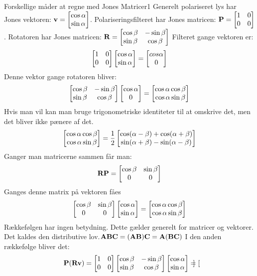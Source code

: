 \begin{opgave}{Forskellige måder at regne med Jones Matricer}{1}
Generelt polariseret lys har Jones vektoren: $\v v = \xy{\cos \alpha}{\sin \alpha}$. Polariseringsfilteret har Jones matricen: 
$\v P = \begin{bmatrix}
1&0\\0&0
\end{bmatrix}$.
Rotatoren har Jones matricen: $\v R = \begin{bmatrix}
\cos\beta & -\sin\beta\\\sin\beta&\cos\beta
\end{bmatrix}$
\opg Filteret gange vektoren er:
$$
\begin{bmatrix}
1&0\\0&0
\end{bmatrix}
\xy{\cos\alpha}{\sin\alpha} = \xy{cos\alpha}{0}
$$
Denne vektor gange rotatoren bliver:
$$
\begin{bmatrix}
\cos \beta&-\sin\beta\\\sin \beta&\cos\beta
\end{bmatrix}
\xy{\cos\alpha}{0}=
\xy{\cos\alpha\cos\beta}{\cos\alpha\sin\beta}
$$
Hvis man vil kan man bruge trigonometriske identiteter til at omskrive det, men det bliver ikke pænere af det.
$$
\xy{\cos\alpha\cos\beta}{\cos\alpha\sin\beta}=
\frac{1}{2}\xy{\cos(\alpha-\beta)+\cos(\alpha+\beta)}{\sin(\alpha+\beta)-\sin(\alpha-\beta)}
$$
\opg Ganger man matricerne sammen får man:
$$
\v R\v P=
\begin{bmatrix}
\cos\beta&\sin\beta\\0&0
\end{bmatrix}
$$
Ganges denne matrix på vektoren fåes
$$
\begin{bmatrix}
\cos\beta & \sin\beta \\ 0 & 0
\end{bmatrix}
\xy{\cos\alpha}{\sin\alpha}=
\xy{\cos\alpha\cos\beta}{\cos\alpha\sin\beta}
$$
Rækkefølgen har ingen betydning. Dette gælder generelt for matricer og vektorer. Det kaldes den distributive lov.$\v A\v B\v C=(\v A\v B)\v C=\v A(\v B\v C)$
\opg
I den anden rækkefølge bliver det:
$$
\v P(\v R \v v ) = 
\begin{bmatrix}
1&0\\0&0
\end{bmatrix}
\begin{bmatrix}
\cos\beta & -\sin\beta\\\sin\beta&\cos\beta
\end{bmatrix}
\xy{\cos\alpha}{\sin\alpha}
=
\begin{bmatrix}

\end{bmatrix}$$
\end{opgave}
